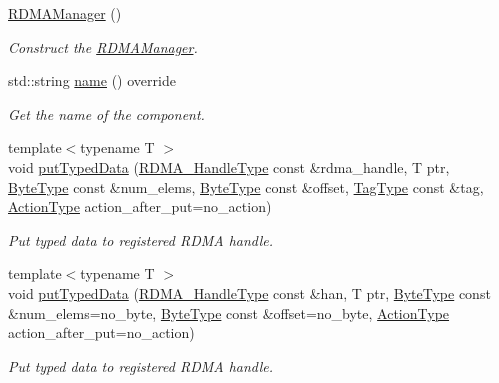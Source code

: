 \begin{DoxyCompactItemize}
\item 
\hyperlink{structvt_1_1rdma_1_1_r_d_m_a_manager_aef98ba273bd7756fcf6ff71c96db391b}{R\+D\+M\+A\+Manager} ()
\begin{DoxyCompactList}\small\item\em Construct the \hyperlink{structvt_1_1rdma_1_1_r_d_m_a_manager}{R\+D\+M\+A\+Manager}. \end{DoxyCompactList}\item 
std\+::string \hyperlink{structvt_1_1rdma_1_1_r_d_m_a_manager_add0f236b62fd550b8eb3d78156a97403}{name} () override
\begin{DoxyCompactList}\small\item\em Get the name of the component. \end{DoxyCompactList}\item 
{\footnotesize template$<$typename T $>$ }\\void \hyperlink{structvt_1_1rdma_1_1_r_d_m_a_manager_a30167dbd8b0165a273a9d91c84acded1}{put\+Typed\+Data} (\hyperlink{namespacevt_a10442579ec4e7ebef223818e64bcf908}{R\+D\+M\+A\+\_\+\+Handle\+Type} const \&rdma\+\_\+handle, T ptr, \hyperlink{namespacevt_aab8d55968084610ce3b17057981e9300}{Byte\+Type} const \&num\+\_\+elems, \hyperlink{namespacevt_aab8d55968084610ce3b17057981e9300}{Byte\+Type} const \&offset, \hyperlink{namespacevt_a84ab281dae04a52a4b243d6bf62d0e52}{Tag\+Type} const \&tag, \hyperlink{namespacevt_ae0a5a7b18cc99d7b732cb4d44f46b0f3}{Action\+Type} action\+\_\+after\+\_\+put=no\+\_\+action)
\begin{DoxyCompactList}\small\item\em Put typed data to registered R\+D\+MA handle. \end{DoxyCompactList}\item 
{\footnotesize template$<$typename T $>$ }\\void \hyperlink{structvt_1_1rdma_1_1_r_d_m_a_manager_a553764f2d91b42cf97991bbeadb75a5c}{put\+Typed\+Data} (\hyperlink{namespacevt_a10442579ec4e7ebef223818e64bcf908}{R\+D\+M\+A\+\_\+\+Handle\+Type} const \&han, T ptr, \hyperlink{namespacevt_aab8d55968084610ce3b17057981e9300}{Byte\+Type} const \&num\+\_\+elems=no\+\_\+byte, \hyperlink{namespacevt_aab8d55968084610ce3b17057981e9300}{Byte\+Type} const \&offset=no\+\_\+byte, \hyperlink{namespacevt_ae0a5a7b18cc99d7b732cb4d44f46b0f3}{Action\+Type} action\+\_\+after\+\_\+put=no\+\_\+action)
\begin{DoxyCompactList}\small\item\em Put typed data to registered R\+D\+MA handle. \end{DoxyCompactList}\item 

\end{DoxyCompactItemize}
